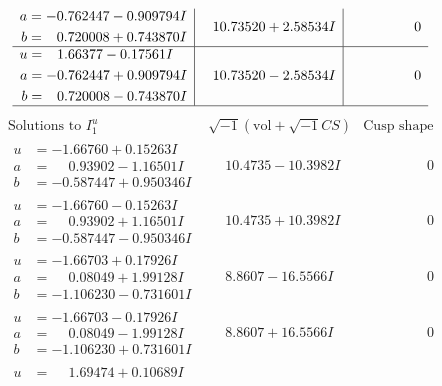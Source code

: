 \documentclass[1p]{elsarticle_modified}
\theoremstyle{definition}
\newcommand{\I}{\sqrt{-1}}
\begin{document}
$$\begin{array}{c|c|c}
\begin{aligned}
a &= -0.762447 - 0.909794 I \\
b &= \phantom{-}0.720008 + 0.743870 I\end{aligned}
 & \phantom{-}10.73520 + 2.58534 I & \phantom{-0.000000 } 0 \\ \hline\begin{aligned}
u &= \phantom{-}1.66377 - 0.17561 I \\
a &= -0.762447 + 0.909794 I \\
b &= \phantom{-}0.720008 - 0.743870 I\end{aligned}
 & \phantom{-}10.73520 - 2.58534 I & \phantom{-0.000000 } 0\\
 \hline 
 \end{array}$$\newpage$$\begin{array}{c|c|c}  
\text{Solutions to }I^u_{1}& \I (\text{vol} + \sqrt{-1}CS) & \text{Cusp shape}\\
 \hline 
\begin{aligned}
u &= -1.66760 + 0.15263 I \\
a &= \phantom{-}0.93902 - 1.16501 I \\
b &= -0.587447 + 0.950346 I\end{aligned}
 & \phantom{-}10.4735 - 10.3982 I & \phantom{-0.000000 } 0 \\ \hline\begin{aligned}
u &= -1.66760 - 0.15263 I \\
a &= \phantom{-}0.93902 + 1.16501 I \\
b &= -0.587447 - 0.950346 I\end{aligned}
 & \phantom{-}10.4735 + 10.3982 I & \phantom{-0.000000 } 0 \\ \hline\begin{aligned}
u &= -1.66703 + 0.17926 I \\
a &= \phantom{-}0.08049 + 1.99128 I \\
b &= -1.106230 - 0.731601 I\end{aligned}
 & \phantom{-}8.8607 - 16.5566 I & \phantom{-0.000000 } 0 \\ \hline\begin{aligned}
u &= -1.66703 - 0.17926 I \\
a &= \phantom{-}0.08049 - 1.99128 I \\
b &= -1.106230 + 0.731601 I\end{aligned}
 & \phantom{-}8.8607 + 16.5566 I & \phantom{-0.000000 } 0 \\ \hline\begin{aligned}
u &= \phantom{-}1.69474 + 0.10689 I \\

\end{aligned}
\end{array}$$
\end{document}
